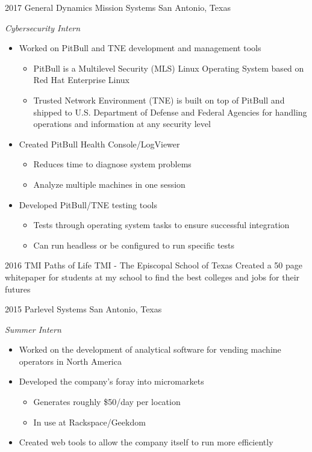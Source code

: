 \documentclass[]{friggeri-cv} %
\begin{document}
\begin{entrylist}
	\entry
	{2017}
	{General Dynamics Mission Systems}
	{San Antonio, Texas}
	{\emph{Cybersecurity Intern}
		\begin{itemize}
			\item Worked on PitBull and TNE development and management tools
				\begin{itemize}
					\item PitBull is a Multilevel Security (MLS) Linux Operating System based on Red Hat Enterprise Linux
					\item Trusted Network Environment (TNE) is built on top of PitBull and shipped to U.S. Department of Defense and Federal Agencies for handling operations and information at any security level 
				\end{itemize}			
			\item Created PitBull Health Console/LogViewer
				\begin{itemize}
					\item Reduces time to diagnose system problems
					\item Analyze multiple machines in one session
				\end{itemize}
			\item Developed PitBull/TNE testing tools
				\begin{itemize}
					\item Tests through operating system tasks to ensure successful integration
					\item Can run headless or be configured to run specific tests
				\end{itemize} 
		\end{itemize}
	}


	\entry
	{2016}
	{TMI Paths of Life}
	{TMI - The Episcopal School of Texas}
	{Created a 50 page whitepaper for students at my school to find the best colleges and jobs for their futures}


	\entry
	{2015}
	{Parlevel Systems}
	{San Antonio, Texas}
	{\emph{Summer Intern}
		\begin{itemize}
			\item Worked on the development of analytical software for vending machine operators in North America
			\item Developed the company's foray into micromarkets
				\begin{itemize}
					\item Generates roughly \$50/day per location
					\item In use at Rackspace/Geekdom
				\end{itemize}
			\item Created web tools to allow the company itself to run more efficiently
		\end{itemize}
	}


\end{entrylist}
\end{document}
